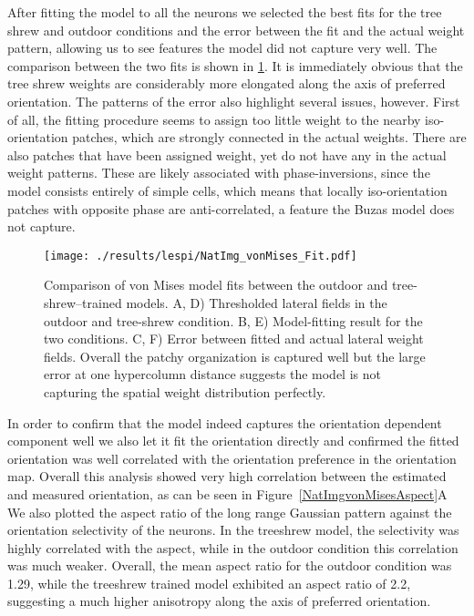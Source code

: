 After fitting the model to all the neurons we selected the best fits
for the tree shrew and outdoor conditions and the error between the
fit and the actual weight pattern, allowing us to see features the
model did not capture very well. The comparison between the two fits
is shown in \ref{NatImgvonMises}. It is immediately obvious that the
tree shrew weights are considerably more elongated along the axis of
preferred orientation. The patterns of the error also highlight
several issues, however.  First of all, the fitting procedure seems to
assign too little weight to the nearby iso-orientation patches, which
are strongly connected in the actual weights. There are also patches
that have been assigned weight, yet do not have any in the actual
weight patterns. These are likely associated with phase-inversions,
since the model consists entirely of simple cells, which means that
locally iso-orientation patches with opposite phase are
anti-correlated, a feature the Buzas model does not capture.

\begin{figure}
	\centering
        \texttt{[image: ./results/lespi/NatImg\_vonMises\_Fit.pdf]}
	\caption[Comparison of \cite{Buzas2006} von Mises model fit
      between the outdoor and treeshrew trained models.]{Comparison of
      \cite{Buzas2006} von Mises model fits between the outdoor and
      tree-shrew--trained models. A, D) Thresholded lateral fields in
      the outdoor and tree-shrew condition. B, E) Model-fitting result
      for the two conditions. C, F) Error between fitted and actual
      lateral weight fields. Overall the patchy organization is
      captured well but the large error at one hypercolumn distance
      suggests the model is not capturing the spatial weight
      distribution perfectly.}
	\label{NatImgvonMises}
\end{figure}

In order to confirm that the model indeed captures the orientation
dependent component well we also let it fit the orientation directly
and confirmed the fitted orientation was well correlated with the
orientation preference in the orientation map. Overall this analysis
showed very high correlation between the estimated and measured
orientation, as can be seen in Figure~\ref{NatImgvonMisesAspect}A We
also plotted the aspect ratio of the long range Gaussian pattern
against the orientation selectivity of the neurons. In the treeshrew
model, the selectivity was highly correlated with the aspect, while in
the outdoor condition this correlation was much weaker. Overall, the
mean aspect ratio for the outdoor condition was 1.29, while the
treeshrew trained model exhibited an aspect ratio of 2.2, suggesting a
much higher anisotropy along the axis of preferred orientation.

